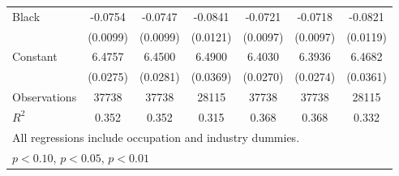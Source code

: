 {\begin{longtable}{l*{6}{c}}
Black               &     -0.0754\sym{***}&     -0.0747\sym{***}&     -0.0841\sym{***}&     -0.0721\sym{***}&     -0.0718\sym{***}&     -0.0821\sym{***}\\
                    &    (0.0099)         &    (0.0099)         &    (0.0121)         &    (0.0097)         &    (0.0097)         &    (0.0119)         \\
Constant            &      6.4757\sym{***}&      6.4500\sym{***}&      6.4900\sym{***}&      6.4030\sym{***}&      6.3936\sym{***}&      6.4682\sym{***}\\
                    &    (0.0275)         &    (0.0281)         &    (0.0369)         &    (0.0270)         &    (0.0274)         &    (0.0361)         \\
\hline  
Observations        &       37738         &       37738         &       28115         &       37738         &       37738         &       28115         \\
\(R^{2}\)           &       0.352         &       0.352         &       0.315         &       0.368         &       0.368         &       0.332         \\
\hline  
\multicolumn{7}{l}{\footnotesize All regressions include occupation and industry dummies.}\\
\multicolumn{7}{l}{\footnotesize \sym{*} \(p<0.10\), \sym{**} \(p<0.05\), \sym{***} \(p<0.01\)}\\
\end{longtable}
}

